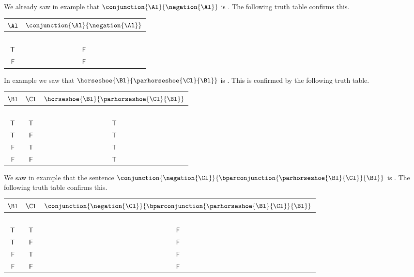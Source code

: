 \begin{majorILnc}{}
We already saw in example  that $\conjunction{\Al}{\negation{\Al}}$ is . 
The following truth table confirms this. 
\begin{center}
\begin{tabular}{ c c }
$\Al$ & $\conjunction{\Al}{\negation{\Al}}$ \\
\hline
$ $ & $ $ \\[-.25cm]
$\mathsf{T}$ & $\mathsf{F}$ \\
$\mathsf{F}$ & $\mathsf{F}$ \\
\end{tabular}
\end{center}
\end{majorILnc}
\begin{majorILnc}{}
In example  we saw that $\horseshoe{\Bl}{\parhorseshoe{\Cl}{\Bl}}$ is .
This is confirmed by the following truth table. 
\begin{center}
\begin{tabular}{ c c c }
$\Bl$ & $\Cl$ & $\horseshoe{\Bl}{\parhorseshoe{\Cl}{\Bl}}$ \\
\hline
$ $ & $ $ & $ $ $ $ \\[-.25cm]
$\mathsf{T}$ & $\mathsf{T}$ & $\mathsf{T}$ \\
$\mathsf{T}$ & $\mathsf{F}$& $\mathsf{T}$ \\
$\mathsf{F}$ & $\mathsf{T}$ & $\mathsf{T}$ \\
$\mathsf{F}$ & $\mathsf{F}$  & $\mathsf{T}$ \\
\end{tabular}
\end{center}
\end{majorILnc}
\begin{majorILnc}{}
We saw in example  that the sentence $\conjunction{\negation{\Cl}}{\bparconjunction{\parhorseshoe{\Bl}{\Cl}}{\Bl}}$ is .
The following truth table confirms this.  
\begin{center}
\begin{tabular}{ c c c }
$\Bl$ & $\Cl$ & $\conjunction{\negation{\Cl}}{\bparconjunction{\parhorseshoe{\Bl}{\Cl}}{\Bl}}$ \\
\hline
$ $ & $ $ & \\[-.25cm]
$\mathsf{T}$ & $\mathsf{T}$ & $\mathsf{F}$ \\
$\mathsf{T}$ & $\mathsf{F}$& $\mathsf{F}$ \\
$\mathsf{F}$ & $\mathsf{T}$ & $\mathsf{F}$ \\
$\mathsf{F}$ & $\mathsf{F}$  & $\mathsf{F}$ \\
\end{tabular}
\end{center}
\end{majorILnc} 

